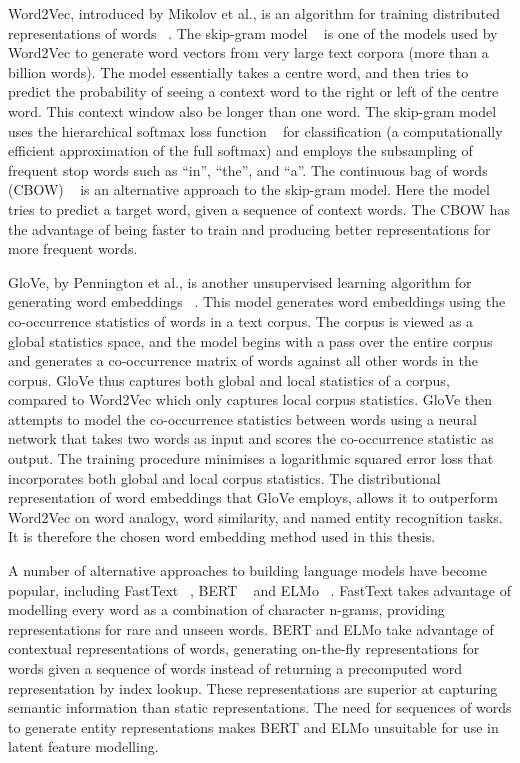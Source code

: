 \noindent Word2Vec, introduced by Mikolov et al., is an algorithm for training distributed representations of words \unskip~\citep{mikolov2013distributed}. The skip-gram model ~\citep{mikolov2013efficient} is one of the models used by Word2Vec to generate word vectors from very large text corpora (more than a billion words). The model essentially takes a centre word, and then tries to predict the probability of seeing a context word to the right or left of the centre word. This context window also be longer than one word. The skip-gram model uses the hierarchical softmax loss function \unskip~\citep{morin2005hierarchical} for classification (a computationally efficient approximation of the full softmax) and employs the subsampling of frequent stop words such as “in”, “the”, and “a”. The continuous bag of words (CBOW) \unskip~\citep{mikolov2013efficient} is an alternative approach to the skip-gram model. Here the model tries to predict a target word, given a sequence of context words. The CBOW has the advantage of being faster to train and producing better representations for more frequent words. \par

\noindent GloVe, by Pennington et al., is another unsupervised learning algorithm for generating word embeddings \unskip~\citep{pennington2014glove}. This model generates word embeddings using the co-occurrence statistics of words in a text corpus. The corpus is viewed as a global statistics space, and the model begins with a pass over the entire corpus and generates a co-occurrence matrix of words against all other words in the corpus. GloVe thus captures both global and local statistics of a corpus, compared to Word2Vec which only captures local corpus statistics. GloVe then attempts to model the co-occurrence statistics between words using a neural network that takes two words as input and scores the co-occurrence statistic as output. The training procedure minimises a logarithmic squared error loss that incorporates both global and local corpus statistics. The distributional representation of word embeddings that GloVe employs, allows it to outperform Word2Vec on word analogy, word similarity, and named entity recognition tasks. It is therefore the chosen word embedding method used in this thesis. \par

\noindent A number of alternative approaches to building language models have become popular, including FastText \unskip~\citep{bojanowski2016enriching}, BERT \unskip~\citep{vaswani2017attention} and ELMo \unskip~\citep{peters2018deep}. FastText takes advantage of modelling every word as a combination of character n-grams, providing representations for rare and unseen words. BERT and ELMo take advantage of contextual representations of words, generating on-the-fly representations for words given a sequence of words instead of returning a precomputed word representation by index lookup. These representations are superior at capturing semantic information than static representations. The need for sequences of words to generate entity representations makes BERT and ELMo unsuitable for use in latent feature modelling.


